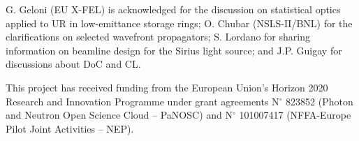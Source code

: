 \documentclass[preprint]{iucr}
\newcommand{\inred}[1]{{\color{red}#1}}
\begin{document}


{}

G. Geloni (EU X-FEL) is acknowledged for the discussion on statistical optics applied to UR in low-emittance storage rings; O. Chubar (NSLS-II/BNL) for the clarifications on selected wavefront propagators; S. Lordano for sharing information on beamline design for the Sirius light source; and J.P. Guigay for discussions about DoC and CL.


This project has received funding from the European Union’s Horizon 2020 Research and Innovation \inred{P}rogramme under grant agreements N$^{\circ}$ 823852 (Photon and Neutron Open Science Cloud -- PaNOSC) and N$^{\circ}$ 101007417 (NFFA-Europe Pilot Joint Activities -- NEP).

\newpage
{}

\end{document}
